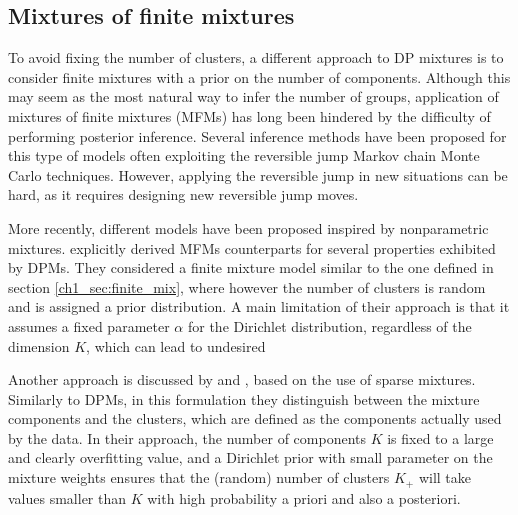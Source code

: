 \subsection{Mixtures of finite mixtures}
To avoid fixing the number of clusters, a different approach to DP mixtures is to consider finite mixtures with a prior on the number of components. Although this may seem as the most natural way to infer the number of groups, application of mixtures of finite mixtures (MFMs) has long been hindered by the difficulty of performing posterior inference. 
Several inference methods have been proposed for this type of models \citep{McCullagh2008,nobile2004,nobile2007,richardson1997} often exploiting the reversible jump Markov chain Monte Carlo techniques. However, applying the reversible jump in new situations can be hard, as it requires designing new reversible jump moves.

More recently, different models have been proposed inspired by nonparametric mixtures. \citet{miller2018} explicitly derived MFMs counterparts for several properties exhibited by DPMs. They considered a finite mixture model similar to the one defined in section \ref{ch1_sec:finite_mix}, where however the number of clusters is random and is assigned a prior distribution. A main limitation of their approach is that it assumes a fixed parameter $\alpha$ for the Dirichlet distribution, regardless of the dimension $K$, which can lead to undesired 

Another approach is discussed by \citet{malsinerwalli2016} and \cite{fs2019}, based on the use of sparse mixtures. Similarly to DPMs, in this formulation they distinguish between the mixture components and the clusters, which are defined as the components actually used by the data. In their approach, the number of components $K$ is fixed to a large and clearly overfitting value, and a Dirichlet prior with small parameter on the mixture weights ensures that the (random) number of clusters $K_+$ will take values smaller than $K$ with high probability a priori and also a posteriori.

